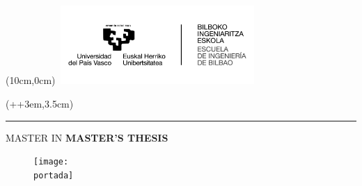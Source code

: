 
\begin{titlepage}
    \begin{textblock*}{\textwidth}(10cm,0cm)
        \includegraphics[width=7.5cm, height=3cm]{images/shared/Logo_EHU.jpg}
    \end{textblock*}
    
    
    \begin{textblock*}{\paperwidth}(\dimexpr\parindent+\oddsidemargin+3em\relax,3.5cm)
        \begin{minipage}{\dimexpr\linewidth-7.5cm\relax}
            \color{white}
            \noindent\rule{\linewidth}{0cm}
            \textsf{ {\large MASTER IN \master}}
            \newline
            \newline \newline
            \textsf{\textbf{ {\Huge MASTER'S THESIS }}}
        \end{minipage}
    \end{textblock*}
    
    \vspace*{3.5cm}
    \begin{minipage}{\linewidth}
        \setlength{\baselineskip}{1.7\baselineskip}
        \centering
        \textsf{ \textbf{ {\LARGE \titulo }}}
    \end{minipage}

    \vspace*{0.5cm}
    \begin{figure}[H]
        \centering
        \texttt{[image: \\portada]}
    \end{figure}


\end{titlepage}
